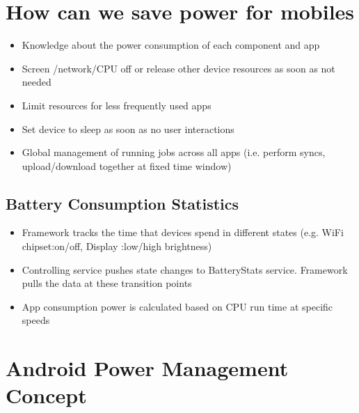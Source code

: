 \documentclass{article}
\begin{document}
\tableofcontents

\newpage

\section{How can we save power for mobiles}

\begin{itemize}
  \item Knowledge about the power consumption of each component and app 
  \item Screen /network/CPU off or release other device resources as soon as not needed 
  \item Limit resources for less frequently used apps 
  \item Set device to sleep as soon as no user interactions 
  \item Global management of running jobs across all apps (i.e. perform syncs, upload/download together at fixed time window)
\end{itemize}

\subsection{Battery Consumption Statistics}

\begin{itemize}
  \item Framework tracks the time that devices spend in different states (e.g. WiFi chipset:on/off, Display :low/high brightness) 
  \item Controlling service pushes state changes to BatteryStats service. Framework pulls the data at these transition points 
  \item App consumption power is calculated based on CPU run time at specific speeds
\end{itemize}

\section{Android Power Management Concept}
\end{document}
